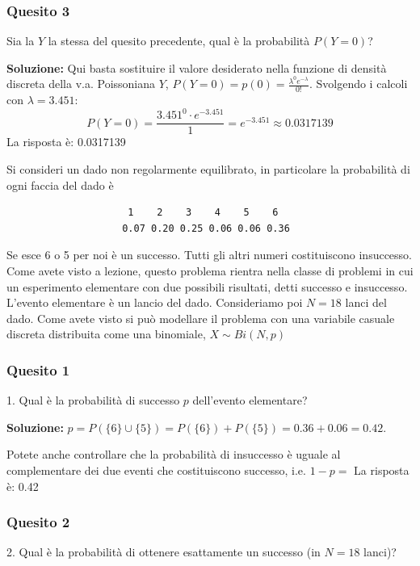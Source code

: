 \documentclass[12pt, a4paper]{article}
\begin{document}
\newpage

\subsubsection*{Quesito 3}
Sia la $Y$ la stessa del quesito precedente, qual è la probabilità $P(Y=0)$?

\textbf{Soluzione:}
Qui basta sostituire il valore desiderato nella funzione di densità discreta della v.a. Poissoniana $Y$, $P(Y=0)=p(0)=\frac{\lambda^0 e^{-\lambda}}{0!}$. Svolgendo i calcoli con $\lambda = 3.451$:
$$ P(Y=0) = \frac{3.451^0 \cdot e^{-3.451}}{1} = e^{-3.451} \approx 0.0317139 $$
La risposta è: 0.0317139


\vspace{0.5cm}
\begin{tcolorbox}[colback=lightergray!10, colframe=tocsec, title=\textbf{Esercizio 2}]
Si consideri un dado non regolarmente equilibrato, in particolare la probabilità di ogni faccia del dado è
\begin{verbatim}
                     1    2    3    4    5    6 
                    0.07 0.20 0.25 0.06 0.06 0.36
\end{verbatim}

Se esce 6 o 5 per noi è un successo. Tutti gli altri numeri costituiscono insuccesso. Come avete visto a lezione, questo problema rientra nella classe di problemi in cui un esperimento elementare con due possibili risultati, detti successo e insuccesso.
L’evento elementare è un lancio del dado.
Consideriamo poi $N=18$ lanci del dado. Come avete visto si può modellare il problema con una variabile casuale discreta distribuita come una binomiale, $X \sim Bi(N,p)$
\end{tcolorbox}

\subsubsection*{Quesito 1}
1. Qual è la probabilità di successo $p$ dell’evento elementare?

\textbf{Soluzione:}
$p=P(\{6\} \cup \{5\}) = P(\{6\}) + P(\{5\}) = 0.36 + 0.06 = 0.42$.

Potete anche controllare che la probabilità di insuccesso è uguale al complementare dei due eventi che costituiscono successo, i.e. $1-p=$
La risposta è: 0.42

\subsubsection*{Quesito 2}
2. Qual è la probabilità di ottenere esattamente un successo (in $N=18$ lanci)?
\end{document}
